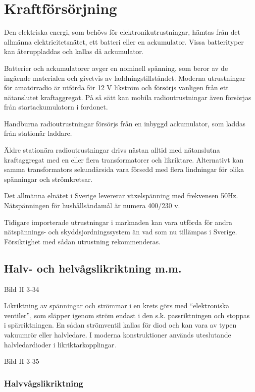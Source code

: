 \section{Kraftförsörjning}

Den elektriska energi, som behövs för elektronikutrustningar, hämtas
från det allmänna elektricitetsnätet, ett batteri eller en
ackumulator. Vissa batterityper kan återuppladdas och kallas då
ackumulator.

Batterier och ackumulatorer avger en nominell spänning, som beror av
de ingående materialen och givetvis av laddningstillståndet. Moderna
utrustningar för amatörradio är utförda för 12 V likström och försörjs
vanligen från ett nätanslutet kraftaggregat. På så sätt kan mobila
radioutrustningar även försörjas från startackumulatorn i fordonet.

Handburna radioutrustningar försörjs från en inbyggd ackumulator, som
laddas från stationär laddare.

Äldre stationära radioutrustningar drivs nästan alltid med nätanslutna
kraftaggregat med en eller flera transformatorer och
likriktare. Alternativt kan samma transformators sekundärsida vara
försedd med flera lindningar för olika spänningar och strömkretsar.

Det allmänna elnätet i Sverige levererar växelspänning med frekvensen
50Hz. Nätspänningen för hushållsändamål är numera 400/230 v.

Tidigare importerade utrustningar i marknaden kan vara utförda för
andra nätspännings- och skyddsjordningssystem än vad som nu tillämpas
i Sverige. Försiktighet med sådan utrustning rekommenderas.

\subsection{Halv- och helvågslikriktning m.m.}

Bild II 3-34

Likriktning av spänningar och strömmar i en krets görs med
``elektroniska ventiler'', som släpper igenom ström endast i den
s.k. passriktningen och stoppas i spärriktningen. En sådan strömventil
kallas för diod och kan vara av typen vakuumrör eller halvledare. I
moderna konstruktioner används uteslutande halvledardioder i
likriktarkopplingar.

Bild II 3-35

\subsubsection{Halvvågslikriktning}


